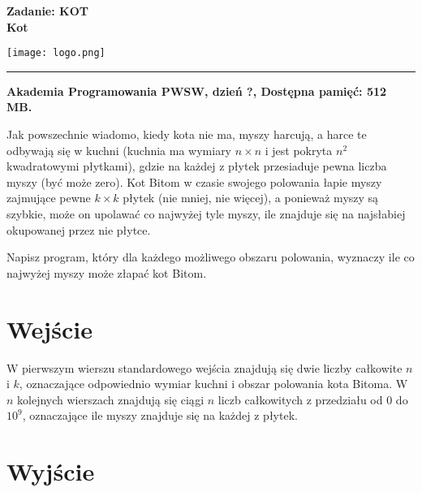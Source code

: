 \documentclass[10pt]{article}
\begin{document}
    

    \noindent
    \begin{minipage}{0.5\textwidth}
        \LARGE{\textsf{\textbf{Zadanie: KOT\\Kot}}}
    \end{minipage}
    \begin{minipage}{0.5\textwidth}
        \begin{flushright}
            \texttt{[image: logo.png]}
        \end{flushright}
    \end{minipage}
    
    \noindent\rule{\textwidth}{0.4pt}
    
    \noindent\textbf{Akademia Programowania PWSW, dzień ?, Dostępna pamięć: 512 MB.}
    \vspace{1em}
    
    
    \noindent
    Jak powszechnie wiadomo, kiedy kota nie ma, myszy harcują, a harce te odbywają się w kuchni (kuchnia ma wymiary $n \times n$ i jest pokryta $n^{2}$ kwadratowymi płytkami), gdzie na każdej z płytek przesiaduje pewna liczba myszy (być może zero). Kot Bitom w czasie swojego polowania łapie myszy zajmujące pewne $k \times k$ płytek (nie mniej, nie więcej), a ponieważ myszy są szybkie, może on upolawać co najwyżej tyle myszy, ile znajduje się na najsłabiej okupowanej przez nie płytce.

    Napisz program, który dla każdego możliwego obszaru polowania, wyznaczy ile co najwyżej myszy może złapać kot Bitom.


    \section*{Wejście}
    
    W pierwszym wierszu standardowego wejścia znajdują się dwie liczby całkowite $n$ i $k$, oznaczające odpowiednio wymiar kuchni i obszar polowania kota Bitoma. W $n$ kolejnych wierszach znajdują się ciągi $n$ liczb całkowitych z przedziału od 0 do $10^{9}$, oznaczające ile myszy znajduje się na każdej z płytek.


    \section*{Wyjście}
    
\end{document}
